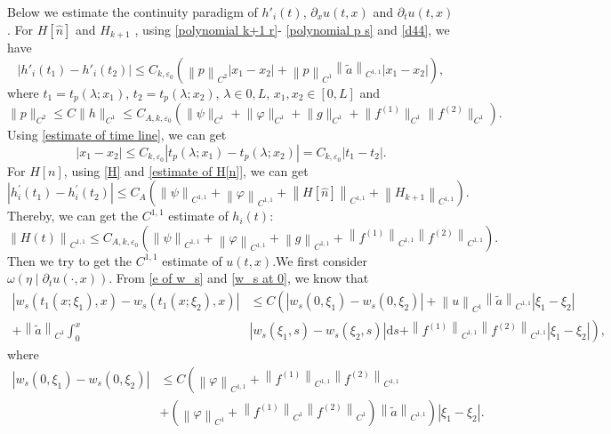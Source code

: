 \documentclass[a4paper,reqno,11pt]{amsart}
\numberwithin{equation}{section} %
\begin{document}
Below we estimate the continuity paradigm of  $h'_i(t)$, $\partial _x u(t,x)$ and  $\partial _t u(t,x)$ .
For $ H\left[ \hat{n} \right] $ and $H_{k+1}$ , using \eqref{polynomial k+1 r}- \eqref{polynomial p s} and \eqref{d44}, we have
$$
\left| h' _i\left( t_1 \right) -h'_i\left( t_2 \right) \right|\leq C_{k,\varepsilon _0}(\left\| p \right\| _{C^2}\left| x_1-x_2 \right|+\left\| p \right\| _{C^1}\left\| \tilde{a} \right\| _{C^{1,1}}\left| x_1-x_2 \right|),
$$
where $t_1=t_p(\lambda ;x _1)$, $t_2=t_p(\lambda;x _2)$, $\lambda  \in { 0,L } $, $x _1,x _2 \in [0,L]$  and
$$
\|p\|_{C^2} \leq C\|h\|_{C^1} \leq C_{A,k,\varepsilon _0}(\lVert \psi \rVert _{C^1}+\lVert \varphi  \rVert _{C^1}+  \lVert g \rVert _{C^1}+\lVert f^{(1)} \rVert _{C^1}\lVert f^{(2)} \rVert _{C^1}) .
$$
Using \eqref{estimate of time line}, we can get
$$
\left| x_1-x_2 \right|\le C_{k,\varepsilon _0}\left| t_p\left( \lambda ;x_1 \right) -t_p\left( \lambda ;x_2 \right) \right|=C_{k,\varepsilon _0}\left| t_1-t_2 \right|.
$$
For $ H\left[ n \right] $, using \eqref{H} and \eqref{estimate of H[n]}, we can get
$$
\left| h^{\prime }_i\left( t_1 \right) -h^{\prime }_i\left( t_2 \right) \right|\leq C_A(\left\| \psi \right\| _{C^{1,1}}+\left\| \varphi \right\| _{C^{1,1}}+ \left\|H\left[ \hat{n} \right] \right\| _{C^{1,1}}+\left\|H_{k+1}\right\| _{C^{1,1}}).
$$
Thereby, we can get the $C^{1,1}$ estimate of $h_i(t) $:
$$
\left\| H(t) \right\| _{C^{1,1}}\leq C_{A,k,\varepsilon _0}(\left\| \psi \right\| _{C^{1,1}}+\left\| \varphi \right\| _{C^{1,1}}+\left\| g \right\| _{C^{1,1}}+\left\| f^{(1)} \right\| _{C^{1,1}}\left\| f^{(2)} \right\| _{C^{1,1}}).
$$
Then we try to get the $C^{1,1}$ estimate of $ u(t,x)$.We first consider $\omega \left( \eta \mid \partial _tu(\cdot ,x) \right) $.
From \eqref{e of w_s} and \eqref{w_s at 0}, we know that
$$
\begin{aligned}
\left| w_s\left( t_1\left( x;\xi _1 \right) ,x \right) -w_s\left( t_1\left( x;\xi _2 \right) ,x \right) \right| & \leq C\left( \left| w_s\left( 0,\xi _1 \right) -w_s\left( 0,\xi _2 \right) \right|+\left\| u \right\| _{C^1}\left\| \tilde{a} \right\| _{C^{1,1}}\left| \xi _1-\xi _2 \right| \right. \\
+\left\| \tilde{a} \right\| _{C^1}\int_0^x & {\left| w_s\left( \xi _1,s \right) -w_s\left( \xi _2,s \right) \right|\mathrm{d}s}  \left. +\left\| f^{\left( 1 \right)} \right\| _{C^{1,1}}\left\| f^{\left( 2 \right)} \right\| _{C^{1,1}}\left| \xi _1-\xi _2 \right| \right) ,
\end{aligned}
$$
where
$$
\begin{aligned}
	\left| w_s\left( 0,\xi _1 \right) -w_s\left( 0,\xi _2 \right) \right|& \leq  C\left( \left\| \varphi \right\| _{C^{1,1}}+\left\| f^{(1)} \right\| _{C^{1,1}}\left\| f^{(2)} \right\| _{C^{1,1}} \right.\\
	& \left. +\left( \left\| \varphi \right\| _{C^1}+\left\| f^{(1)} \right\| _{C^1}\left\| f^{(2)} \right\| _{C^1} \right) \left\| \tilde{a} \right\| _{C^{1,1}} \right) \left| \xi _1-\xi _2 \right|.
\end{aligned}
$$
\end{document}
